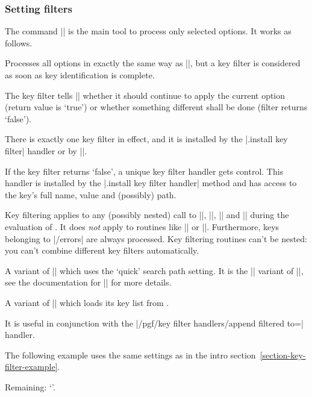 \subsubsection{Setting filters}
The command |\pgfkeysfiltered| is the main tool to process only selected options. It works as follows.
\begin{command}{\pgfkeysfiltered{}}
	Processes all options in exactly the same way as |\pgfkeys|, but a key filter is considered as soon as key identification is complete.

	The key filter tells |\pgfkeysfiltered| whether it should continue to apply the current option (return value is `true') or whether something different shall be done (filter returns `false').

	There is exactly one key filter in effect, and it is installed by the |.install key filter| handler or by |\pgfkeysinstallkeyfilter|.

	If the key filter returns `false', a unique key filter handler gets control. This handler is installed by the |.install key filter handler| method and has access to the key's full name, value and (possibly) path.

	Key filtering applies to any (possibly nested) call to |\pgfkeys|, |\pgfkeysalso|, |\pgfqkeys| and |\pgfqkeysalso| during the evaluation of . It does \emph{not} apply to routines like |\pgfkeyssetvalue| or |\pgfkeysgetvalue|. Furthermore, keys belonging to |/errors| are always processed. Key filtering routines can't be nested: you can't combine different key filters automatically.
\end{command}

\begin{command}{\pgfqkeysfiltered{}}
	A variant of |\pgfkeysfiltered| which uses the `quick' search path setting. It is the |\pgfqkeys| variant of |\pgfkeysfiltered|, see the documentation for |\pgfqkeys| for more details.
\end{command}

\begin{command}{\pgfkeysalsofrom{}}
	A variant of |\pgfkeysalso| which loads its key list from .

	It is useful in conjunction with the |/pgf/key filter handlers/append filtered to=| handler.

	The following example uses the same settings as in the intro section~\ref{section-key-filter-example}.
\begin{codeexample}[]
\def\remainingoptions{}

Remaining: `\remainingoptions'.
\pgfkeysalsofrom{\remainingoptions}
\end{codeexample}
\end{command}

